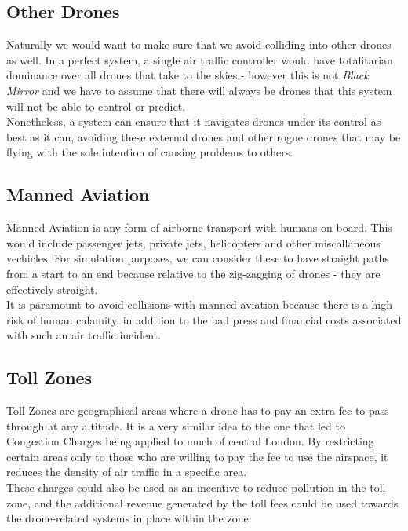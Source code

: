 \documentclass[a4paper,11pt,titlepage]{report}
\begin{document}
\subsection{Other Drones}
Naturally we would want to make sure that we avoid colliding into other drones as well. In a perfect system, a single air traffic controller would have totalitarian dominance over all drones that take to the skies - however this is not \textit{Black Mirror} and we have to assume that there will always be drones that this system will not be able to control or predict. \\

Nonetheless, a system can ensure that it navigates drones under its control as best as it can, avoiding these external drones and other rogue drones that may be flying with the sole intention of causing problems to others.

\clearpage
\subsection{Manned Aviation}
Manned Aviation is any form of airborne transport with humans on board. This would include passenger jets, private jets, helicopters and other miscallaneous vechicles. For simulation purposes, we can consider these to have straight paths from a start to an end because relative to the zig-zagging of drones - they are effectively straight.\\

It is paramount to avoid collisions with manned aviation because there is a high risk of human calamity, in addition to the bad press and financial costs associated with such an air traffic incident.

\subsection{Toll Zones}
Toll Zones are geographical areas where a drone has to pay an extra fee to pass through at any altitude. It is a very similar idea to the one that led to Congestion Charges being applied to much of central London. By restricting certain areas only to those who are willing to pay the fee to use the airspace, it reduces the density of air traffic in a specific area.\\

These charges could also be used as an incentive to reduce pollution in the toll zone, and the additional revenue generated by the toll fees could be used towards the drone-related systems in place within the zone.
\end{document}
